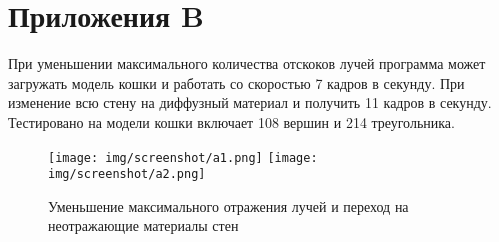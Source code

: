 \chapter*{Приложения B}
\label{cha:appendix2}

При уменьшении максимального количества отскоков лучей программа может загружать
модель кошки и работать со скоростью 7 кадров в секунду.
При изменение всю стену на диффузный материал и получить 11 кадров в секунду.
Тестировано на модели кошки включает 108 вершин и 214 треугольника.

\begin{figure}[H]
    \centering
    \texttt{[image: img/screenshot/a1.png]}
    \texttt{[image: img/screenshot/a2.png]}
    \caption{Уменьшение максимального отражения лучей и переход на неотражающие материалы стен}
    \label{fig:appendix2}
\end{figure}
